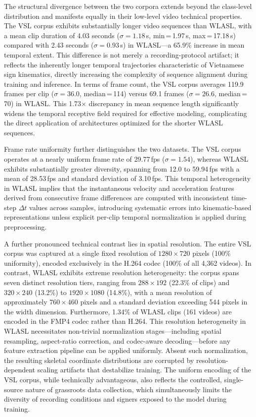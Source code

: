 \documentclass{ieeeaccess}
\begin{document}
The structural divergence between the two corpora extends beyond the class-level distribution and manifests equally in their low-level video technical properties. The VSL corpus exhibits substantially longer video sequences than WLASL, with a mean clip duration of 4.03 seconds ($\sigma = 1.18$\,s, min\,=\,1.97\,s, max\,=\,17.18\,s) compared with 2.43 seconds ($\sigma = 0.93$\,s) in WLASL—a 65.9\% increase in mean temporal extent. This difference is not merely a recording-protocol artifact; it reflects the inherently longer temporal trajectories characteristic of Vietnamese sign kinematics, directly increasing the complexity of sequence alignment during training and inference. In terms of frame count, the VSL corpus averages 119.9 frames per clip ($\sigma = 36.0$, median\,=\,114) versus 69.1 frames ($\sigma = 26.6$, median\,=\,70) in WLASL. This 1.73$\times$ discrepancy in mean sequence length significantly widens the temporal receptive field required for effective modeling, complicating the direct application of architectures optimized for the shorter WLASL sequences.

Frame rate uniformity further distinguishes the two datasets. The VSL corpus operates at a nearly uniform frame rate of 29.77\,fps ($\sigma = 1.54$), whereas WLASL exhibits substantially greater diversity, spanning from 12.0 to 59.94\,fps with a mean of 28.53\,fps and standard deviation of 3.10\,fps. This temporal heterogeneity in WLASL implies that the instantaneous velocity and acceleration features derived from consecutive frame differences are computed with inconsistent time-step $\Delta t$ values across samples, introducing systematic errors into kinematic-based representations unless explicit per-clip temporal normalization is applied during preprocessing.

A further pronounced technical contrast lies in spatial resolution. The entire VSL corpus was captured at a single fixed resolution of $1280 \times 720$ pixels (100\% uniformity), encoded exclusively in the H.264 codec (100\% of all 4,362 videos). In contrast, WLASL exhibits extreme resolution heterogeneity: the corpus spans seven distinct resolution tiers, ranging from $288 \times 192$ (22.3\% of clips) and $320 \times 240$ (13.2\%) to $1920 \times 1080$ (14.8\%), with a mean resolution of approximately $760 \times 460$ pixels and a standard deviation exceeding 544 pixels in the width dimension. Furthermore, 1.34\% of WLASL clips (161 videos) are encoded in the FMP4 codec rather than H.264. This resolution heterogeneity in WLASL necessitates non-trivial normalization stages—including spatial resampling, aspect-ratio correction, and codec-aware decoding—before any feature extraction pipeline can be applied uniformly. Absent such normalization, the resulting skeletal coordinate distributions are corrupted by resolution-dependent scaling artifacts that destabilize training. The uniform encoding of the VSL corpus, while technically advantageous, also reflects the controlled, single-source nature of grassroots data collection, which simultaneously limits the diversity of recording conditions and signers exposed to the model during training.
\end{document}
